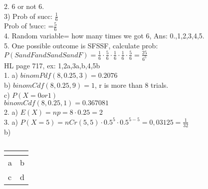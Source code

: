 \documentclass{article}
\begin{document}
  2. 6 or not 6.\\
  3)
  Prob of succ: $\frac{1}{6}$\\
  Prob of !succ: =$\frac{5}{6}$\\
  4. Random variable= how many times we got 6, Ans: 0.,1,2,3,4,5.\\
  5. One possible outcome is SFSSF, calculate prob:\\
  $P(S and F and S and S and F)=\frac{1}{6}\cdot\frac{5}{6}\cdot\frac{1}{6}\cdot\frac{1}{6}\cdot\frac{5}{6}=\frac{25}{6^5}$\\
  HL page 717, ex: 1,2a,3a,b,4,5b\\
  1. a) $binomPdf(8,0.25,3)=0.2076$\\
  b) $binomCdf(8,0.25,9)=1$, r is more than 8 trials.\\
  c) $P(X=0 or 1)$\\
  $binomCdf(8,0.25,1)=0.367081$\\
  2. a) $E(X)=np=8\cdot0.25=2$\\
  3. a) $P(X=5)=nCr(5,5)\cdot 0.5^5\cdot 0.5^{5-5}=0,03125=\frac{1}{32}$\\
  b)\\
  \begin{table}
    \caption{}\label{tab:}
    \begin{center}
      \begin{tabular}[c]{l|l}
        \hline
        \multicolumn{1}{c|}{\textbf{}} & 
        \multicolumn{1}{c}{\textbf{}} \\
        \hline
        a & b \\
        c & d \\
        
        \hline
      \end{tabular}
    \end{center}
  \end{table}
  

   
\end{document}
